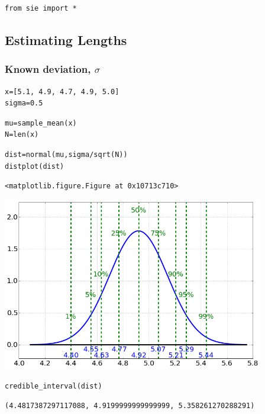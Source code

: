 \begin{lstlisting}
from sie import *
\end{lstlisting}

\subsection{Estimating Lengths}


\subsubsection{Known deviation, $\sigma$}


\begin{lstlisting}
x=[5.1, 4.9, 4.7, 4.9, 5.0]
sigma=0.5
\end{lstlisting}

\begin{lstlisting}
mu=sample_mean(x)
N=len(x)
\end{lstlisting}

\begin{lstlisting}
dist=normal(mu,sigma/sqrt(N))
distplot(dist)
\end{lstlisting}

\begin{verbatim}
<matplotlib.figure.Figure at 0x10713c710>\end{verbatim}

\begin{center}\includegraphics[width=4.5in]{Priors_Likelihoods_and_Posteriors/Priors_Likelihoods_and_Posteriors_fig0.png}\end{center}

\begin{lstlisting}
credible_interval(dist)
\end{lstlisting}

\begin{verbatim}
(4.4817387297117088, 4.9199999999999999, 5.358261270288291)
\end{verbatim}

